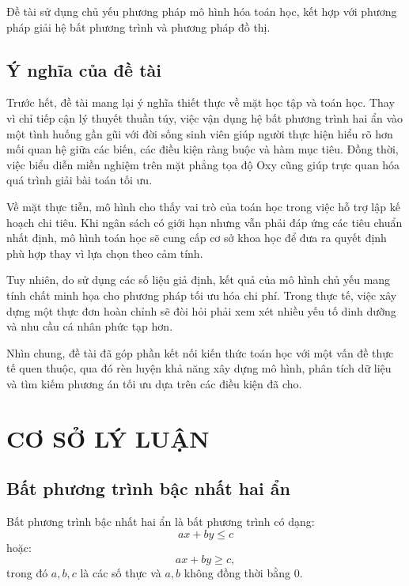\documentclass[12pt,a4paper]{article}
\begin{document}
Đề tài sử dụng chủ yếu phương pháp mô hình hóa toán học, kết hợp với phương pháp giải hệ bất phương trình và phương pháp đồ thị.



\subsection{Ý nghĩa của đề tài}

Trước hết, đề tài mang lại ý nghĩa thiết thực về mặt học tập và toán học. Thay vì chỉ tiếp cận lý thuyết thuần túy, việc vận dụng hệ bất phương trình hai ẩn vào một tình huống gần gũi với đời sống sinh viên giúp người thực hiện hiểu rõ hơn mối quan hệ giữa các biến, các điều kiện ràng buộc và hàm mục tiêu. Đồng thời, việc biểu diễn miền nghiệm trên mặt phẳng tọa độ Oxy cũng giúp trực quan hóa quá trình giải bài toán tối ưu.

Về mặt thực tiễn, mô hình cho thấy vai trò của toán học trong việc hỗ trợ lập kế hoạch chi tiêu. Khi ngân sách có giới hạn nhưng vẫn phải đáp ứng các tiêu chuẩn nhất định, mô hình toán học sẽ cung cấp cơ sở khoa học để đưa ra quyết định phù hợp thay vì lựa chọn theo cảm tính.

Tuy nhiên, do sử dụng các số liệu giả định, kết quả của mô hình chủ yếu mang tính chất minh họa cho phương pháp tối ưu hóa chi phí. Trong thực tế, việc xây dựng một thực đơn hoàn chỉnh sẽ đòi hỏi phải xem xét nhiều yếu tố dinh dưỡng và nhu cầu cá nhân phức tạp hơn.

Nhìn chung, đề tài đã góp phần kết nối kiến thức toán học với một vấn đề thực tế quen thuộc, qua đó rèn luyện khả năng xây dựng mô hình, phân tích dữ liệu và tìm kiếm phương án tối ưu dựa trên các điều kiện đã cho.

\newpage

\section{CƠ SỞ LÝ LUẬN}

\subsection{Bất phương trình bậc nhất hai ẩn}

Bất phương trình bậc nhất hai ẩn là bất phương trình có dạng:
\[
ax+by\leq c
\]
hoặc:
\[
ax+by\geq c,
\]
trong đó $a,b,c$ là các số thực và $a,b$ không đồng thời bằng $0$.
\end{document}
